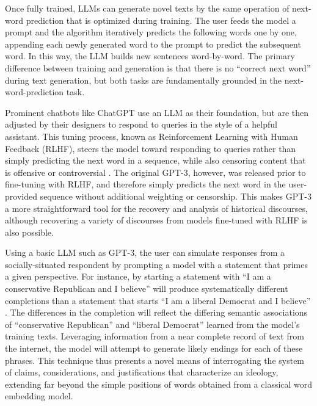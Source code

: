 \documentclass{article} %
\begin{document}
Once fully trained, LLMs can generate novel texts by the same operation
of next-word prediction that is optimized during training. The user
feeds the model a prompt and the algorithm iteratively predicts the
following words one by one, appending each newly generated word to the
prompt to predict the subsequent word. In this way, the LLM builds new
sentences word-by-word. The primary difference between training and
generation is that there is no ``correct next word'' during text
generation, but both tasks are fundamentally grounded in the
next-word-prediction task.

Prominent chatbots like ChatGPT use an LLM as their foundation, but are
then adjusted by their designers to respond to queries in the style of a
helpful assistant. This tuning process, known as Reinforcement Learning
with Human Feedback (RLHF), steers the model toward responding to
queries rather than simply predicting the next word in a sequence, while
also censoring content that is offensive or controversial
\parencite{Ouyang2022-xw,}. The
original GPT-3, however, was released prior to fine-tuning with RLHF,
and therefore simply predicts the next word in the user-provided
sequence without additional weighting or censorship. This makes GPT-3 a
more straightforward tool for the recovery and analysis of historical
discourses, although recovering a variety of discourses from models
fine-tuned with RLHF is also possible.

Using a basic LLM such as GPT-3, the user can simulate responses from a
socially-situated respondent by prompting a model with a statement that
primes a given perspective. For instance, by starting a statement with
``I am a conservative Republican and I believe'' will produce
systematically different completions than a statement that starts ``I am
a liberal Democrat and I believe''
\parencite{Argyle2023-ii}. The
differences in the completion will reflect the differing semantic
associations of ``conservative Republican'' and ``liberal Democrat''
learned from the model's training texts. Leveraging information from a
near complete record of text from the internet, the model will attempt
to generate likely endings for each of these phrases. This technique
thus presents a novel means of interrogating the system of claims,
considerations, and justifications that characterize an ideology,
extending far beyond the simple positions of words obtained from a
classical word embedding model.
\end{document}
